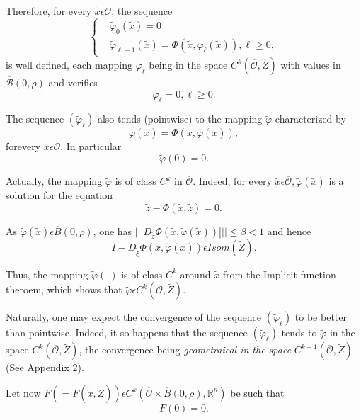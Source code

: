 Therefore, for every $\widetilde{x} \epsilon \overline{\mathscr{O}}$, the
sequence
\begin{equation*}
\begin{cases}
& \widetilde{\varphi}_{0}(\widetilde{x}) = 0\\
& \widetilde{\varphi}_{\ell + 1}(\widetilde{x}) = \Phi(\widetilde{x},
  \varphi_{\ell}(\widetilde{x})), \ell \geq 0,
\end{cases}\tag{6.1}\label{chap4-eq6.1}
\end{equation*}
is well defined, each mapping $\widetilde{\varphi}_{\ell}$ being in
the space $C^{k}(\overline{\mathscr{O}}, \widetilde{Z})$ with values in
$\overline{\mathscr{B}} (0, \rho)$ and verifies
$$
\widetilde{\varphi}_{\ell} = 0, \ell \geq 0.
$$

The sequence $(\widetilde{\varphi}_{\ell})$ also tends (pointwise) to
the mapping $\widetilde{\varphi}$ characterized by
$$
\widetilde{\varphi}(\widetilde{x}) = \Phi(\widetilde{x},
\widetilde{\varphi}(\widetilde{x})), 
$$
for\pageoriginale every $\widetilde{x} \epsilon \overline{\mathscr{O}}$. In
particular
$$
\widetilde{\varphi}(0) = 0.
$$

Actually, the mapping $\widetilde{\varphi}$ is of class $C^{k}$ in
$\overline{\mathscr{O}}$. Indeed, for every $\widetilde{x} \epsilon
\overline{\mathscr{O}}, \widetilde{\varphi}(\widetilde{x})$ is a
solution for the equation
$$
\widetilde{z} - \Phi(\widetilde{x}, \widetilde{z}) = 0.
$$

As $\widetilde{\varphi}(\widetilde{x}) \epsilon \overline{B}(0,
\rho)$, one has $|||D_{\widetilde{z}} \Phi (\widetilde{x},
\widetilde{\varphi}(\widetilde{x}))||| \leq \beta < 1$ and hence
$$
I - D_{\widetilde{\xi}}\Phi(\widetilde{x},
\widetilde{\varphi}(\widetilde{x})) \epsilon Isom (\widetilde{Z}).
$$

Thus, the mapping $\widetilde{\varphi}(\cdot)$ is of class $C^{k}$
around $\widetilde{x}$ from the Implicit function theroem, which shows
that $\widetilde{\varphi} \epsilon C^{k}(\mathscr{O}, \widetilde{Z})$.

Naturally, one may expect the convergence of the sequence
$(\widetilde{\varphi}_{\ell})$ to be better than pointwise. Indeed, it
so happens that the sequence $(\widetilde{\varphi}_{\ell})$ tends to
$\widetilde{\varphi}$ in the space $C^{k}(\overline{\mathscr{O}},
\widetilde{Z})$, the convergence being {\em geometraical in the space}
$C^{k-1} (\overline{\mathscr{O}}, \widetilde{Z})$ (See Appendix 2).

Let now $F(= F(\widetilde{x}, \widetilde{Z})) \epsilon
C^{k}(\overline{\mathscr{O}} \times \overline{B}(0, \rho),
\mathbb{R}^{n})$ be such that
$$
F(0) = 0.
$$


